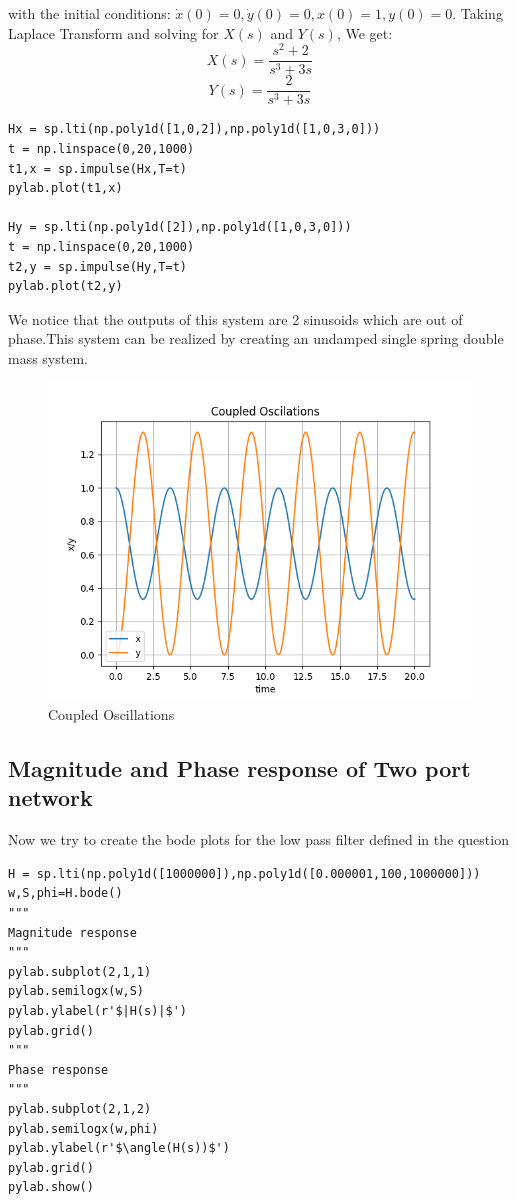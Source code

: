 \documentclass{article}
\begin{document}
with the initial conditions: $\dot x(0) =0,\dot y(0) =0,x(0) =1,y(0) =0$.
Taking Laplace Transform and solving for $X(s)$ and $Y(s)$, We get:
\begin{equation}
    X(s) = \frac{s^2+2}{s^3 + 3s}
\end{equation}
\begin{equation}
    Y(s) = \frac{2}{s^3 + 3s}
\end{equation}
\begin{lstlisting}
Hx = sp.lti(np.poly1d([1,0,2]),np.poly1d([1,0,3,0]))
t = np.linspace(0,20,1000)
t1,x = sp.impulse(Hx,T=t)
pylab.plot(t1,x)

Hy = sp.lti(np.poly1d([2]),np.poly1d([1,0,3,0]))
t = np.linspace(0,20,1000)
t2,y = sp.impulse(Hy,T=t)
pylab.plot(t2,y)
\end{lstlisting}
We notice that the outputs of this system are 2 sinusoids which are out of phase.This system can be realized by creating an undamped single spring double mass system.
\begin{figure}[h!]
\centering
\includegraphics[scale=0.55]{Figure_3}
\caption{Coupled Oscillations}
\label{fig:Coupled Oscillations}
\end{figure}
\clearpage
\subsection{Magnitude and Phase response of Two port network}

Now we try to create the bode plots for the low pass filter defined in the question
\begin{lstlisting}
H = sp.lti(np.poly1d([1000000]),np.poly1d([0.000001,100,1000000]))
w,S,phi=H.bode()
"""
Magnitude response
"""
pylab.subplot(2,1,1)
pylab.semilogx(w,S)
pylab.ylabel(r'$|H(s)|$')
pylab.grid()
"""
Phase response
"""
pylab.subplot(2,1,2)
pylab.semilogx(w,phi)
pylab.ylabel(r'$\angle(H(s))$')
pylab.grid()
pylab.show()
\end{lstlisting}
\end{document}
